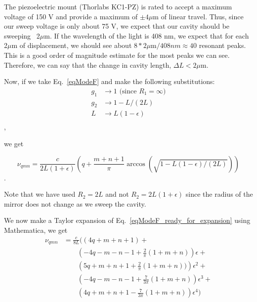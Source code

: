 The piezoelectric mount (Thorlabs KC1-PZ) is rated to accept a maximum voltage of 150 V and provide a maximum of $\pm4\mu$m of linear travel. Thus, since our sweep voltage is only about 75 V, we expect that our cavity should be sweeping ~2$\mu$m. If the wavelength of the light is 408 nm, we expect that for each 2$\mu$m of displacement, we should see about $8*2\mu$m$/408nm \approx 40$ resonant peaks. This is a good order of magnitude estimate for the most peaks we can see. Therefore, we can say that the change in cavity length, $\Delta L< 2\mu$m.

Now, if we take Eq.\ \ref{eqModeF} and make the following substitutions:
\begin{align}
g_1&\rightarrow1 \text{ (since $R_1=\infty$)} \\
g_2&\rightarrow 1-L/(2L)\\
L&\rightarrow L(1-\epsilon)\\
\end{align},

we get 

\begin{equation} \label{eqModeF_ready_for_expansion}
\nu_{qmn}=\frac{c}{2L(1+\epsilon)}\left(q+\frac{m+n+1}{\pi}\arccos(\sqrt{1-L(1-\epsilon)/(2L)})\right)
\end{equation}.

Note that we have used $R_2=2L$ and not $R_2=2L(1+\epsilon)$ since the radius of the mirror does not change as we sweep the cavity. 

We now make a Taylor expansion of Eq.\ \ref{eqModeF_ready_for_expansion} using Mathematica, we get 
\begin{align*}
\nu_{qmn}&=\frac{c}{8L}\biggl((4q+m+n+1) +\\
& \quad \quad \left(-4q-m-n-1+\frac{2}{\pi}(1+m+n)\right)\epsilon+\\
& \quad \quad \left(5q+m+n+1+\frac{2}{\pi}(1+m+n))\right)\epsilon^2+\\
& \quad \quad \left(-4q-m-n-1+\frac{7}{3\pi}(1+m+n)\right)\epsilon^3+\\
& \quad \quad \left(4q+m+n+1-\frac{7}{3\pi}(1+m+n)\right)\epsilon^4
\biggr)
\end{align*}

